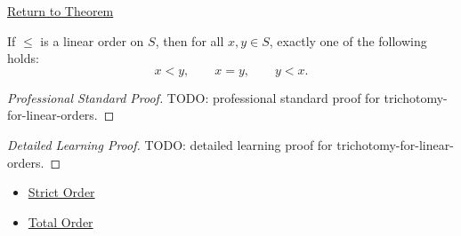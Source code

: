 \newpage
{}
\label{prf:trichotomy-for-linear-orders}

\begin{remark*}[Return]
\hyperref[thm:trichotomy-for-linear-orders]{Return to Theorem}
\end{remark*}

\begin{theorem*}
If $\leq$ is a linear order on $S$, then for all $x,y\in S$, exactly one of
the following holds:
\[
x<y,\qquad x=y,\qquad y<x.
\]
\end{theorem*}

\begin{proof}[Professional Standard Proof]
\LRAProofBodyStart
TODO: professional standard proof for trichotomy-for-linear-orders.
\end{proof}

\begin{proof}[Detailed Learning Proof]
\LRAProofBodyStart
TODO: detailed learning proof for trichotomy-for-linear-orders.
\end{proof}

\begin{remark*}
\end{remark*}

\begin{dependencies}
\begin{itemize}
  \item \hyperref[def:strict-order]{Strict Order}
  \item \hyperref[def:total-order]{Total Order}
\end{itemize}
\end{dependencies}

\clearpage
